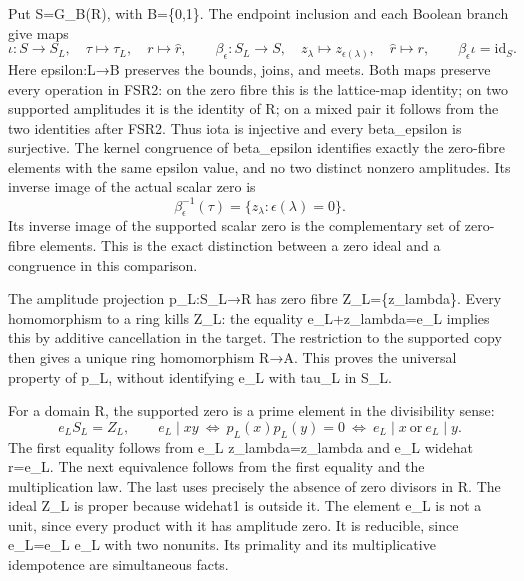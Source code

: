 \documentclass[
  10pt,
  a4paper,
]{article}
\begin{document}
Put S=G\_B(R), with B=\{0,1\}. The endpoint inclusion and each Boolean
branch give maps \[
\iota:S\longrightarrow S_L,\quad \tau\mapsto\tau_L,\quad r\mapsto\widehat r,
\qquad
\beta_\epsilon:S_L\longrightarrow S,\quad
z_\lambda\mapsto z_{\epsilon(\lambda)},\quad \widehat r\mapsto r,
\qquad \beta_\epsilon\iota=\mathrm{id}_S.
\tag{FSR3}
\] Here epsilon:L→B preserves the bounds, joins, and meets. Both maps
preserve every operation in FSR2: on the zero fibre this is the
lattice-map identity; on two supported amplitudes it is the identity of
R; on a mixed pair it follows from the two identities after FSR2. Thus
iota is injective and every beta\_epsilon is surjective. The kernel
congruence of beta\_epsilon identifies exactly the zero-fibre elements
with the same epsilon value, and no two distinct nonzero amplitudes. Its
inverse image of the actual scalar zero is \[
\beta_\epsilon^{-1}(\tau)=\{z_\lambda:\epsilon(\lambda)=0\}.
\tag{FSR4}
\] Its inverse image of the supported scalar zero is the complementary
set of zero-fibre elements. This is the exact distinction between a zero
ideal and a congruence in this comparison.

The amplitude projection p\_L:S\_L→R has zero fibre Z\_L=\{z\_lambda\}.
Every homomorphism to a ring kills Z\_L: the equality
e\_L+z\_lambda=e\_L implies this by additive cancellation in the target.
The restriction to the supported copy then gives a unique ring
homomorphism R→A. This proves the universal property of p\_L, without
identifying e\_L with tau\_L in S\_L.

For a domain R, the supported zero is a prime element in the
divisibility sense: \[
e_L S_L=Z_L,
\qquad e_L\mid xy\ \Longleftrightarrow\ p_L(x)p_L(y)=0
\ \Longleftrightarrow\ e_L\mid x\ \text{or}\ e_L\mid y.
\tag{FSR5}
\] The first equality follows from e\_L z\_lambda=z\_lambda and e\_L
widehat r=e\_L. The next equivalence follows from the first equality and
the multiplication law. The last uses precisely the absence of zero
divisors in R. The ideal Z\_L is proper because widehat1 is outside it.
The element e\_L is not a unit, since every product with it has
amplitude zero. It is reducible, since e\_L=e\_L e\_L with two nonunits.
Its primality and its multiplicative idempotence are simultaneous facts.
\end{document}
